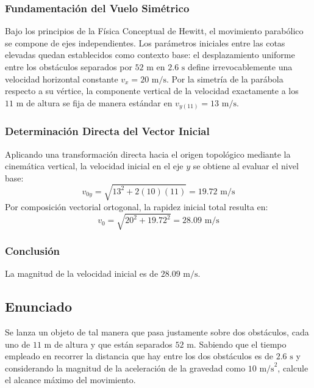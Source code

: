 \documentclass[12pt, a4paper]{article}
\begin{document}
\subsubsection*{Fundamentación del Vuelo Simétrico}
Bajo los principios de la Física Conceptual de Hewitt, el movimiento parabólico se compone de ejes independientes. Los parámetros iniciales entre las cotas elevadas quedan establecidos como contexto base: el desplazamiento uniforme entre los obstáculos separados por $52\text{ m}$ en $2.6\text{ s}$ define irrevocablemente una velocidad horizontal constante $v_x = 20\text{ m/s}$. Por la simetría de la parábola respecto a su vértice, la componente vertical de la velocidad exactamente a los $11\text{ m}$ de altura se fija de manera estándar en $v_{y(11)} = 13\text{ m/s}$.

\subsubsection*{Determinación Directa del Vector Inicial}
Aplicando una transformación directa hacia el origen topológico mediante la cinemática vertical, la velocidad inicial en el eje $y$ se obtiene al evaluar el nivel base:
\begin{equation*}
v_{0y} = \sqrt{13^2 + 2(10)(11)} = 19.72\text{ m/s}
\end{equation*}
Por composición vectorial ortogonal, la rapidez inicial total resulta en:
\begin{equation*}
v_0 = \sqrt{20^2 + 19.72^2} = 28.09\text{ m/s}
\end{equation*}

\subsubsection*{Conclusión}
La magnitud de la velocidad inicial es de $28.09\text{ m/s}$.

\newpage

\subsection*{Enunciado}

Se lanza un objeto de tal manera que pasa justamente sobre dos obstáculos, cada uno de $11\text{ m}$ de altura y que están separados $52\text{ m}$. Sabiendo que el tiempo empleado en recorrer la distancia que hay entre los dos obstáculos es de $2.6\text{ s}$ y considerando la magnitud de la aceleración de la gravedad como $10\text{ m/s}^2$, calcule el alcance máximo del movimiento.
\end{document}
